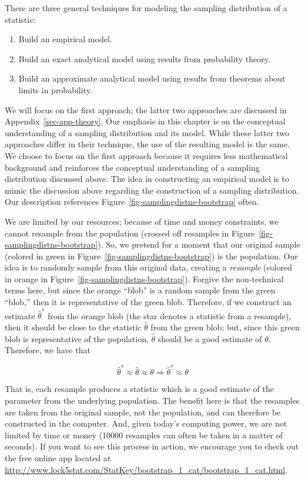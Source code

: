 \documentclass[
  letterpaper,
  DIV=11,
  numbers=noendperiod]{scrreprt}
\providecommand{\tightlist}{%
  \setlength{\itemsep}{0pt}\setlength{\parskip}{0pt}}\usepackage{longtable,booktabs,array}
\theoremstyle{plain}
\theoremstyle{definition}
\theoremstyle{definition}
\theoremstyle{remark}
\begin{document}
There are three general techniques for modeling the sampling
distribution of a statistic:

\begin{enumerate}
\def\labelenumi{\arabic{enumi}.}
\tightlist
\item
  Build an empirical model.
\item
  Build an exact analytical model using results from probability theory.
\item
  Build an approximate analytical model using results from theorems
  about limits in probability.
\end{enumerate}

We will focus on the first approach; the latter two approaches are
discussed in Appendix~\ref{sec-app-theory}. Our emphasis in this chapter
is on the conceptual understanding of a sampling distribution and its
model. While these latter two approaches differ in their technique, the
use of the resulting model is the same. We choose to focus on the first
approach because it requires less mathematical background and reinforces
the conceptual understanding of a sampling distribution discussed above.
The idea in constructing an empirical model is to mimic the discussion
above regarding the construction of a sampling distribution. Our
description references Figure~\ref{fig-samplingdistns-bootstrap} often.

We are limited by our resources; because of time and money constraints,
we cannot resample from the population (crossed off resamples in
Figure~\ref{fig-samplingdistns-bootstrap}). So, we pretend for a moment
that our original sample (colored in green in
Figure~\ref{fig-samplingdistns-bootstrap}) is the population. Our idea
is to randomly sample from this original data, creating a
\emph{resample} (colored in orange in
Figure~\ref{fig-samplingdistns-bootstrap}). Forgive the non-technical
terms here, but since the orange ``blob'' is a random sample from the
green ``blob,'' then it is representative of the green blob. Therefore,
if we construct an estimate \(\widehat{\theta}^*\) from the orange blob
(the star denotes a statistic from a resample), then it should be close
to the statistic \(\widehat{\theta}\) from the green blob; but, since
this green blob is representative of the population,
\(\widehat{\theta}\) should be a good estimate of \(\theta\). Therefore,
we have that

\[
\widehat{\theta}^* \approx \widehat{\theta} \approx \theta \Rightarrow \widehat{\theta}^* \approx \theta
\]

That is, each resample produces a statistic which is a good estimate of
the parameter from the underlying population. The benefit here is that
the resamples are taken from the original sample, not the population,
and can therefore be constructed in the computer. And, given today's
computing power, we are not limited by time or money (10000 resamples
can often be taken in a matter of seconds). If you want to see this
process in action, we encourage you to check out the free online app
located at
\url{http://www.lock5stat.com/StatKey/bootstrap_1_cat/bootstrap_1_cat.html}.
\end{document}
